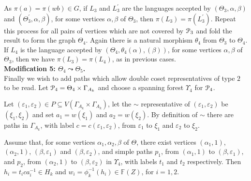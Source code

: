 \documentclass[a4paper,12pt]{article}
\renewcommand{\a}{\alpha }
\renewcommand{\b}{\beta }
\newcommand{\G}{\Gamma }
\newcommand{\e}{\varepsilon }
\newcommand{\T}{\Theta }
\newcommand{\U}{\Upsilon }
\newcommand{\cP}{{\cal{P}}}
\numberwithin{equation}{section}
\numberwithin{figure}{section}
\newcommand{\FF}{\ensuremath{\mathbb{F}}}
\begin{document}
As $\pi(a)=\pi(wb)\in G$, if $L_3$ and $L_3^\prime$ are the languages
accepted by $(\T_3,\a,\b)$ and $(\T_3^\prime,\a,\b)$, for some
vertices $\a,\b$ of $\T_3$, then $\pi(L_3)=\pi(L_3^\prime)$.
Repeat this process for all pairs of  vertices which are not
covered by $\cP_3$  and fold
the result to form the graph $\T_4$. Again there is a natural
morphism $\theta_4$ from $\T_3$ to $\T_4$. If $L_4$ is the
language accepted by $(\T_4,\theta_4(\a),(\b))$, for some
vertices $\a,\b$ of $\Theta_3$, then
we have $\pi(L_3)=\pi(L_4)$, as in previous cases.\\[1em]


\noindent\textbf{Modification 5: $\T_4\leadsto \T_5$.}\\
Finally we wish to add paths which allow double coset representatives
of type $2$ to be read.
Let $\cP_4=\T_4\times \G_{A_k}$ and choose a spanning forest $\U_4$ for
$\cP_4$.

Let $(\e_1,\e_2)\in P\subseteq V(\G_{A_k}\times \G_{A_k})$, let 
 the $\sim$ representative of $(\e_1,\e_2)$ be $(\xi_1,\xi_2)$ and  
set $a_1=w(\xi_1)$ and $a_2=w(\xi_2)$.
By definition of $\sim$ there are  paths in $\G_{A_k}$,
with label
$c=c(\e_1,\e_2)$, from $\e_1$ to $\xi_1$ and $\e_2$ to $\xi_2$.

Assume that, for  some vertices $\a_1,\a_2, \b$ of $\T$, there exist vertices
$(\a_1,1)$, $(\a_2,1)$, $(\b,\e_1)$ and $(\b,\e_2)$, and simple 
paths   $p_1$, from $(\a_1,1)$ to $(\b,\e_1)$,
and $p_2$, from
$(\a_2,1)$ to $(\b,\e_2)$ in $\U_4$, with labels $t_1$  and  $t_2$ 
respectively.  Then 
 $h_i=
t_ica_i^{-1}\in H_k$ and $w_i=\phi_k^{-1}(h_i)\in \FF(Z)$, for $i=1,2$. 
\end{document}
